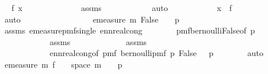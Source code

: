 \begin{isabellebody}
\ \isamarkupfalse%
\ {\isachardoublequoteopen}f\ x\ {\isacharequal}{\kern0pt}\ {}{\isachardoublequoteclose}\isanewline
\ \ \ \ \ \ \ \ \ \ \isamarkupfalse%
\ assms\isanewline
\ \ \ \ \ \ \ \ \ \ \isamarkupfalse%
\ auto\isanewline
\ \ \ \ \ \ \ \ \isamarkupfalse%
\ \isamarkupfalse%
\ {\isachardoublequoteopen}x\ {\isasymin}\ f\ {\isacharminus}{\kern0pt}{\isacharbackquote}{\kern0pt}\ {\isacharbraceleft}{\kern0pt}{}{\isacharbraceright}{\kern0pt}{\isachardoublequoteclose}\isanewline
\ \ \ \ \ \ \ \ \ \ \isamarkupfalse%
\ auto\isanewline
\ \ \ \ \ \ \isamarkupfalse%
\isanewline
\ \ \ \ \isamarkupfalse%
\isanewline
\ \ \ \ \isamarkupfalse%
\ {\isachardoublequoteopen}emeasure\ m\ {\isacharparenleft}{\kern0pt}{\isacharbraceleft}{\kern0pt}False{\isacharbraceright}{\kern0pt}{\isacharparenright}{\kern0pt}\ {\isacharequal}{\kern0pt}\ {}\ {\isacharminus}{\kern0pt}\ p{}{\isachardoublequoteclose}\isanewline
\ \ \ \ \ \ \isamarkupfalse%
\ assms{\isacharparenleft}{\kern0pt}{}{\isacharparenright}{\kern0pt}\ emeasure{\isacharunderscore}{\kern0pt}pmf{\isacharunderscore}{\kern0pt}single\ ennreal{\isacharunderscore}{\kern0pt}cong\isanewline
\ \ \ \ \ \ \isamarkupfalse%
\ pmf{\isacharunderscore}{\kern0pt}bernoulli{\isacharunderscore}{\kern0pt}False{\isacharbrackleft}{\kern0pt}of\ p{}{\isacharbrackright}{\kern0pt}\isanewline
\ \ \ \ \ \ \ \ \ \ \ \ assms{\isacharparenleft}{\kern0pt}{}{\isacharparenright}{\kern0pt}\ \isanewline
\ \ \ \ \ \ \ \ \ \ \ \ assms{\isacharparenleft}{\kern0pt}{}{\isacharparenright}{\kern0pt}\ \isanewline
\ \ \ \ \ \ \ \ \ \ \ \ ennreal{\isacharunderscore}{\kern0pt}cong{\isacharbrackleft}{\kern0pt}of\ {\isachardoublequoteopen}pmf\ {\isacharparenleft}{\kern0pt}bernoulli{\isacharunderscore}{\kern0pt}pmf\ p{}{\isacharparenright}{\kern0pt}\ False{\isachardoublequoteclose}\ {\isachardoublequoteopen}{}\ {\isacharminus}{\kern0pt}\ p{}{\isachardoublequoteclose}{\isacharbrackright}{\kern0pt}\isanewline
\ \ \ \ \ \ \isamarkupfalse%
\ auto\isanewline
\ \ \ \ \isamarkupfalse%
\ \isamarkupfalse%
\ {\isachardoublequoteopen}emeasure\ m\ {\isacharparenleft}{\kern0pt}f\ {\isacharminus}{\kern0pt}{\isacharbackquote}{\kern0pt}\ {\isacharbraceleft}{\kern0pt}{}{\isacharbraceright}{\kern0pt}\ {\isasyminter}\ space\ m{\isacharparenright}{\kern0pt}\ {\isacharequal}{\kern0pt}\ {}\ {\isacharminus}{\kern0pt}\ p{}{\isachardoublequoteclose}\isanewline

\end{isabellebody}

